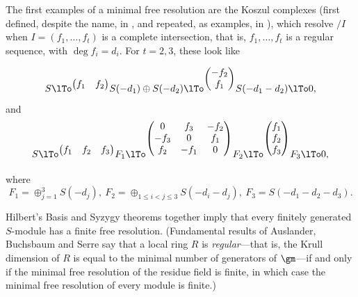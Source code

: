 The first examples of a minimal free resolution are the Koszul complexes
(first defined, despite the name, in \cite{Cayley}, and repeated, as examples, 
in \cite{Hilbert}), which resolve $/I$ when
 $I = (f_1,\dots, f_t)$
is a complete intersection, that is, $f_1,\dots, f_t$ is a regular sequence, with $\deg f_i = d_i$.  For $t = 2,3$, these look like

$$
S
\lTo^{ \begin{pmatrix}
f_1&f_2
\end{pmatrix}} 
S(-d_1)\oplus S(-d_2) 
\lTo^{\begin{pmatrix}
-f_2\\f_1
\end{pmatrix}}
 S(-d_1-d_2)\lTo 0,
$$
and
$$
S
\lTo^{
 \begin{pmatrix}
f_1&f_2&f_3
\end{pmatrix}} 
F_1\lTo^{
\begin{pmatrix}
 0&f_3&-f_2\\
 -f_3&0&f_1\\
 f_2&-f_1&0
\end{pmatrix}}
F_2
\lTo^{\begin{pmatrix}
f_1\\f_2\\f_3
\end{pmatrix}}
 F_3 \lTo 0,
$$

where
$$
F_1 = \oplus_{j=1}^3S(-d_j),\
 F_2=
\oplus_{1\leq i <j\leq 3} S(-d_i-d_j),\ 
F_3 = 
S(-d_1-d_2-d_3).
$$

%

Hilbert's Basis and Syzygy theorems together imply that every finitely generated $S$-module has a finite free resolution. (Fundamental
results of Auslander, Buchsbaum and Serre say that a local ring $R$ is \emph{regular}---that is, the Krull dimension of $R$ is equal to the minimal number
of generators of $\gm$---if and only if the minimal free resolution of the residue field is finite, in which case
the minimal free resolution of every module is finite.)

